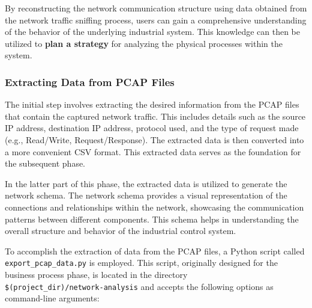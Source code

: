 By reconstructing the network communication structure using data obtained from the network traffic sniffing process, users can gain a comprehensive understanding of the behavior of the underlying industrial system. This knowledge can then be utilized to \textbf{plan a strategy} for analyzing the physical processes within the system.

\subsubsection{Extracting Data from PCAP Files}
\label{subsubsec:4_extract_pcap}
The initial step involves extracting the desired information from the PCAP files that contain the captured network traffic. This includes details such as the source IP address, destination IP address, protocol used, and the type of request made (e.g., Read/Write, Request/Response). The extracted data is then converted into a more convenient CSV format. This extracted data serves as the foundation for the subsequent phase.

In the latter part of this phase, the extracted data is utilized to generate the network schema. The network schema provides a visual representation of the connections and relationships within the network, showcasing the communication patterns between different components. This schema helps in understanding the overall structure and behavior of the industrial control system.

\bigskip
To accomplish the extraction of data from the PCAP files, a Python script called \texttt{export\_pcap\_data.py} is employed. This script, originally designed for the business process phase, is located in the directory\\ \texttt{\$(project\_dir)/network-analysis} and accepts the following options as command-line arguments:


